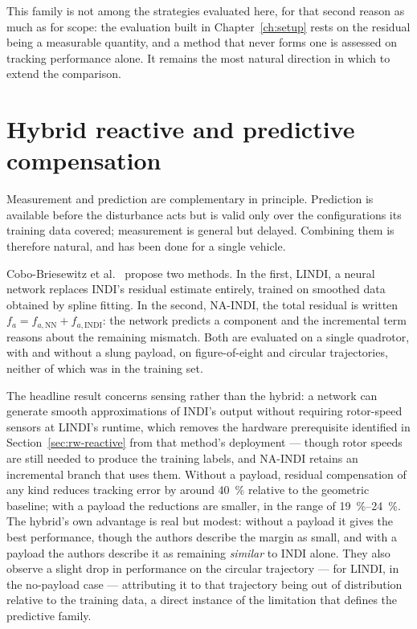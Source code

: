 This family is not among the strategies evaluated here, for that second reason as much as for
scope: the evaluation built in Chapter~\ref{ch:setup} rests on the residual being a measurable
quantity, and a method that never forms one is assessed on tracking performance alone. It remains
the most natural direction in which to extend the comparison.

\section{Hybrid reactive and predictive compensation}
\label{sec:rw-hybrid}

Measurement and prediction are complementary in principle. Prediction is available before the
disturbance acts but is valid only over the configurations its training data covered; measurement
is general but delayed. Combining them is therefore natural, and has been done for a single
vehicle.

Cobo-Briesewitz et al.~\cite{cobobriesewitz2026lindi} propose two methods. In the first, LINDI, a
neural network replaces INDI's residual estimate entirely, trained on smoothed data obtained by
spline fitting. In the second, NA-INDI, the total residual is written \(f_a = f_{a,\mathrm{NN}} +
f_{a,\mathrm{INDI}}\): the network predicts a component and the incremental term reasons about the
remaining mismatch. Both are evaluated on a single quadrotor, with and without
a slung payload, on figure-of-eight and circular trajectories, neither of which was in the
training set.

The headline result concerns sensing rather than the hybrid: a network can generate smooth
approximations of INDI's output without requiring rotor-speed sensors at LINDI's runtime, which
removes the hardware prerequisite identified in Section~\ref{sec:rw-reactive} from that method's
deployment --- though rotor speeds are still needed to produce the training labels, and NA-INDI
retains an incremental branch that uses them. Without a payload, residual compensation of any kind
reduces tracking error by around \SI{40}{\percent} relative to the geometric baseline; with a
payload the reductions are smaller, in the range of \SIrange{19}{24}{\percent}. The hybrid's own
advantage is real but modest: without a payload it gives the best performance, though the authors
describe the margin as small, and with a payload the authors describe it as remaining
\emph{similar} to INDI alone. They also observe a slight drop in performance on the circular
trajectory --- for LINDI, in the no-payload case --- attributing it to that trajectory being out of
distribution relative to the training data, a direct instance of the limitation that defines the
predictive family.


